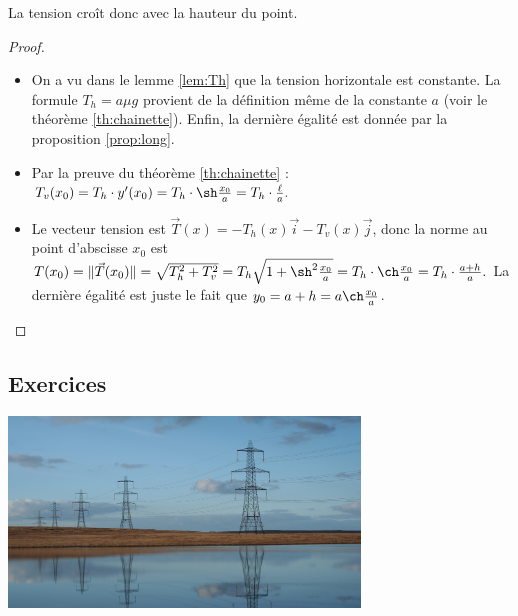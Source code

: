 \documentclass[class=report,crop=false]{standalone}
\begin{document}
La tension croît donc avec la hauteur du point.


\begin{proof}
\begin{itemize}
  \item On a vu dans le lemme \ref{lem:Th} que la tension horizontale est constante. 
  La formule $T_h = a \mu g$ provient de la définition même de la constante $a$ (voir le théorème \ref{th:chainette}).
  Enfin, la dernière égalité est donnée par la proposition \ref{prop:long}.
  
  \item Par la preuve du théorème \ref{th:chainette} : $T_v(x_0) = T_h \cdot y'(x_0) =
  T_h \cdot \sh \frac{x_0}{a} = T_h \cdot \frac \ell a.$
  
  \item Le vecteur tension est $\vec T(x) = -T_h(x)\vec i - T_v(x) \vec j$,
  donc la norme au point d'abscisse $x_0$ est $T(x_0) = \|\vec T(x_0) \| 
  = \sqrt{T_h^2+T_v^2} = T_h \sqrt{1+\sh^2 \frac{x_0}{a}}
  = T_h \cdot \ch \frac{x_0}{a} = T_h \cdot \frac{a+h}{a}.$
  La dernière égalité est juste le fait que $y_0 = a+h = a \ch \frac{x_0}{a}$.
\end{itemize}
\end{proof}




\subsection{Exercices}

\begin{center}
   \includegraphics[width=0.7\textwidth]{figures/Pylones_by_Graham_Sivills.jpg} 
 \end{center}
\end{document}
